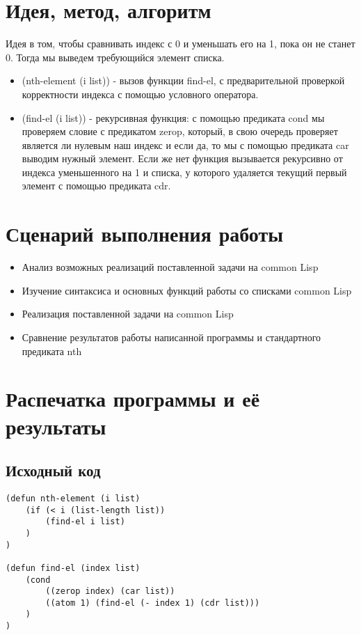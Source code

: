 \documentclass[12pt]{article}
\begin{document}
\section{Идея, метод, алгоритм}
Идея в том, чтобы сравнивать индекс с 0 и уменьшать его на 1, пока он не станет 0. Тогда мы выведем требующийся элемент списка.
\begin{itemize}
\setlength{\itemsep}{-1mm} %
\item (nth-element (i list)) - вызов функции find-el, с предварительной проверкой корректности индекса с помощью условного оператора.
\item (find-el (i list)) - рекурсивная функция: с помощью предиката cond мы проверяем словие с предикатом zerop, который, в свою очередь проверяет является ли нулевым наш индекс и если да, то мы с помощью предиката car выводим нужный элемент. Если же нет функция вызывается рекурсивно от индекса уменьшенного на 1 и списка, у которого удаляется текущий первый элемент с помощью предиката cdr.
\end{itemize}

\section{Сценарий выполнения работы}
\begin{itemize}
\setlength{\itemsep}{-1mm}
\item Анализ возможных реализаций поставленной задачи на common Lisp
\item Изучение синтаксиса и основных функций работы со списками common Lisp
\item Реализация поставленной задачи на common Lisp
\item Сравнение результатов работы написанной программы и стандартного предиката nth
\end{itemize}
\section{Распечатка программы и её результаты}

\subsection{Исходный код}
\begin{verbatim}
(defun nth-element (i list)
    (if (< i (list-length list))
        (find-el i list)
    )
)

(defun find-el (index list)
    (cond
        ((zerop index) (car list))
        ((atom 1) (find-el (- index 1) (cdr list)))
    )
)
\end{verbatim}
\end{document}
